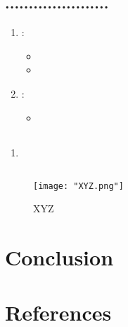 \documentclass[12pt]{report}
\begin{document}
\section{......................}
\begin{enumerate}
    \item {}:
    \begin{itemize}
        \item 
        \item 
    \end{itemize}
    \item \textbf{}:
    \begin{itemize}
        \item 
    \end{itemize}
\end{enumerate}
\section{}
\begin{enumerate}
    \item 
\end{enumerate}
\section{}
\begin{enumerate}
    \item 
    
\section{}
\begin{enumerate}
    \item 
\end{enumerate}

\begin{figure}[H]
    \centering
    \texttt{[image: "XYZ.png"]}
    \caption{XYZ}
    \label{fig:enter-label}
\end{figure}
\section{}

\chapter{Conclusion}

\chapter{References}
\end{document}
